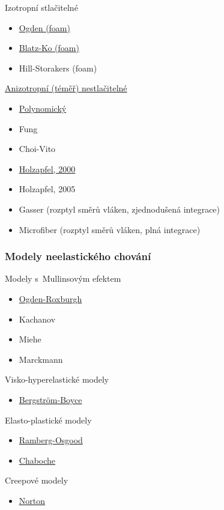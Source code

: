 Izotropní stlačitelné
\begin{itemize}
	\item \hyperref[sec:ogden-foam]{Ogden (foam)}
	\item \hyperref[sec:blatz-ko]{Blatz-Ko (foam)}
	\item Hill-Storakers (foam)
\end{itemize}

\hyperref[sec:anizotropni-hyperelasticke-modely]{Anizotropní (téměř) nestlačitelné}
\begin{itemize}
	\item \hyperref[sec:polynomicky-anizotropni-hyperelasticky-model]{Polynomický}
	\item Fung
	\item Choi-Vito
	\item \hyperref[sec:model-hgo]{Holzapfel, 2000}
	\item Holzapfel, 2005
	\item Gasser (rozptyl směrů vláken, zjednodušená integrace)
	\item Microfiber (rozptyl směrů vláken, plná integrace)
\end{itemize}

\subsubsection{Modely neelastického chování}
Modely s~Mullinsovým efektem
\begin{itemize}
	\item \hyperref[sec:ogden-roxburgh]{Ogden-Roxburgh}
	\item Kachanov
	\item Miehe
	\item Marckmann
\end{itemize}

Visko-hyperelastické modely
\begin{itemize}
	\item \hyperref[sec:bergstrom-boyce]{Bergström-Boyce}
\end{itemize}

Elasto-plastické modely
\begin{itemize}
	\item \hyperref[sec:ramberg-osgood]{Ramberg-Osgood}
	\item \hyperref[sec:chaboche]{Chaboche}
\end{itemize}

Creepové modely
\begin{itemize}
	\item \hyperref[sec:norton]{Norton}
\end{itemize}

